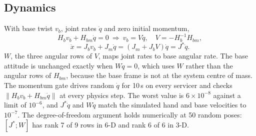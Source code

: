 \documentclass[conference]{IEEEtran}
\newcommand{\qd}{\dot{q}}
\newcommand{\Js}{{J^{*}}}
\begin{document}
\subsection{Dynamics}
With base twist $v_b$, joint rates $\qd$ and zero initial momentum,
\begin{equation}
H_b v_b + H_{bm}\qd = 0\ \Rightarrow\ v_b = V\qd,\quad V = -H_b^{-1}H_{bm},
\end{equation}
\begin{equation}
\dot x = J_b v_b + J_m\qd = (J_m + J_b V)\qd = \Js\qd .
\end{equation}
$W$, the three angular rows of $V$, maps joint rates to base angular rate. The base attitude is unchanged
exactly when $W\qd = 0$, which uses $W$ rather than the angular rows of $H_{bm}$, because the base frame is
not at the system centre of mass. The momentum gate drives random $\qd$ for 10\,s on every servicer and
checks $\|H_b v_b + H_{bm}\qd\|$ at every physics step. The worst value is $6\times10^{-8}$ against a limit of
$10^{-6}$, and $\Js\qd$ and $W\qd$ match the simulated hand and base velocities to $10^{-7}$. The degree-of-freedom
argument holds numerically at 50 random poses: $[\Js;W]$ has rank 7 of 9 rows in 6-D and rank 6 of 6 in 3-D.
\end{document}
